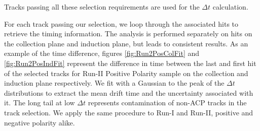 Tracks passing all these selection requirements are used for the $\Delta t$ calculation.

For each track passing our selection, we loop through the associated hits to retrieve the timing information. The analysis is performed separately on hits on the collection plane and induction plane, but leads to consistent results. As an example of the time difference, figures \ref{fig:Run2PosColFit} and \ref{fig:Run2PosIndFit} represent the difference in time between the last and first hit of the selected tracks for Run-II Positive Polarity sample on the collection and induction plane respectively.  We fit with a Gaussian to the peak of the $\Delta t$ distributions to extract the mean drift time and the uncertainty associated with it. The long tail at low $\Delta t$ represents contamination of non-ACP tracks in the track selection.  We apply the same procedure to Run-I and Run-II, positive and negative polarity alike.

